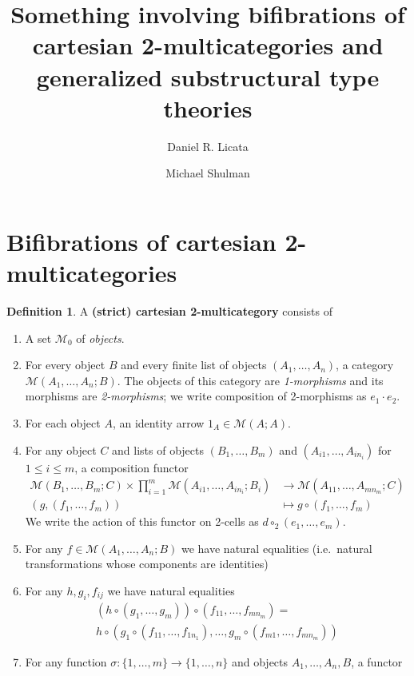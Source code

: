 \documentclass{amsart}
\title{Something involving bifibrations of cartesian 2-multicategories and generalized substructural type theories}
\author{Daniel R. Licata \and Michael Shulman}
\theoremstyle{definition}
\newtheorem{defn}[thm]{Definition}
\def\M{\mathcal{M}}
\newcommand\compv[2]{\ensuremath{#1 \cdot #2}}
\newcommand\comph[2]{\ensuremath{#1 \mathbin{\circ_2} #2}}
\begin{document}
\maketitle

\section{Bifibrations of cartesian 2-multicategories}
\label{sec:bifib-cart-2multi}

\begin{defn}
  A \textbf{(strict) cartesian 2-multicategory} consists of
  \begin{enumerate}
  \item A set $\M_0$ of \emph{objects}.
  \item For every object $B$ and every finite list of objects $(A_1,\dots,A_n)$, a category $\M(A_1,\dots,A_n;B)$.
    The objects of this category are \emph{1-morphisms} and its morphisms are \emph{2-morphisms}; we write composition of 2-morphisms as $\compv{e_1}{e_2}$.
  \item For each object $A$, an identity arrow $1_A\in\M(A;A)$.
  \item For any object $C$ and lists of objects $(B_1,\dots,B_m)$ and $(A_{i1},\dots,A_{in_i})$ for $1\le i\le m$, a composition functor
    \begin{align*}
      \M(B_1,\dots,B_m;C) \times \prod_{i=1}^m \M(A_{i1},\dots,A_{in_i};B_i) &\longrightarrow \M(A_{11},\dots,A_{mn_m};C)\\
      (g,(f_1,\dots,f_m)) &\mapsto g\circ (f_1,\dots,f_m)
    \end{align*}
    We write the action of this functor on 2-cells as $\comph{d}{(e_1,\dots,e_m)}$.
  \item For any $f\in\M(A_1,\dots,A_n;B)$ we have natural equalities (i.e.\ natural transformations whose components are identities)
  \item For any $h,g_i,f_{ij}$ we have natural equalities
    \begin{multline*}
      (h\circ (g_1,\dots,g_m))\circ (f_{11},\dots,f_{mn_m}) =\\
      h \circ (g_1\circ (f_{11},\dots,f_{1n_1}), \dots, g_m \circ (f_{m1},\dots,f_{mn_m}))
    \end{multline*}
  \item For any function $\sigma : \{1,\dots,m\} \to \{1,\dots,n\}$ and objects $A_1,\dots,A_n,B$, a functor

\end{enumerate}
\end{defn}
\end{document}
